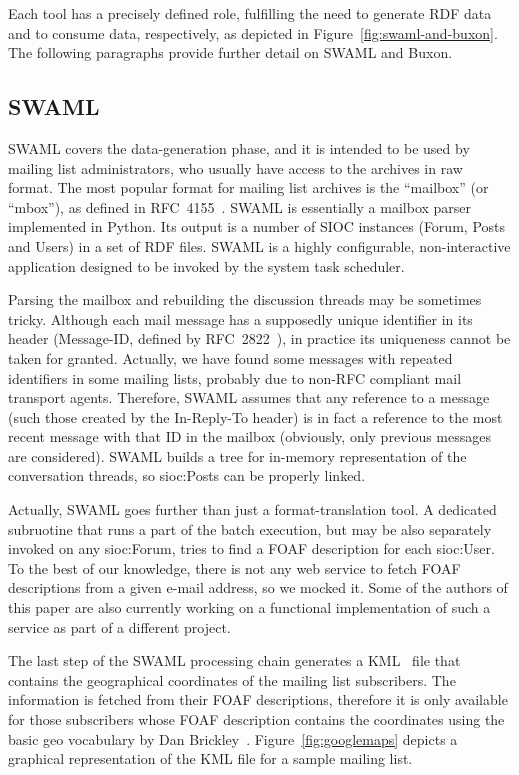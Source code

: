\documentclass{llncs}
\begin{document}
Each tool has a precisely defined role, fulfilling the need to
generate RDF data and to consume data, respectively, as depicted
in Figure~\ref{fig:swaml-and-buxon}. The following paragraphs
provide further detail on SWAML and Buxon.

\subsection{SWAML}

SWAML covers the data-generation phase, and it is intended to be
used by mailing list administrators, who usually have access to
the archives in raw format. The most popular format for
mailing list archives is the ``mailbox'' (or ``mbox''), as defined
in RFC~4155~\cite{RFC4155}. SWAML is essentially a mailbox parser
implemented in Python. Its output is a number of SIOC instances
(\textsf{Forum}, \textsf{Post}s and \textsf{User}s) in a set
of RDF files. SWAML is a highly configurable, non-interactive
application designed to be invoked by the system task scheduler.

Parsing the mailbox and rebuilding the discussion threads may be
sometimes tricky. Although each mail message has a supposedly unique
identifier in its header (\textsf{Message-ID}, defined by
RFC~2822~\cite{RFC2822}), in practice its uniqueness cannot be
taken for granted. Actually, we have found some
messages with repeated identifiers in some mailing lists,
probably due to non-RFC compliant mail transport agents.
Therefore, SWAML assumes that any reference to a message
(such those created by the \textsf{In-Reply-To} header)
is in fact a reference to the most recent message with that ID
in the mailbox (obviously, only previous messages are
considered). SWAML builds a tree for in-memory representation
of the conversation threads, so \textsf{sioc:Post}s can be
properly linked.

Actually, SWAML goes further than just a format-translation
tool. A dedicated subruotine that runs a part of the batch
execution, but may be also separately invoked on any
\textsf{sioc:Forum}, tries to find a FOAF description for
each \textsf{sioc:User}. To the best of our knowledge, there is not
any web service to fetch FOAF descriptions from a given e-mail
address, so we mocked it. Some of the authors of this paper are also
currently working
on a functional implementation of such a service as part of a
different project.

The last step of the SWAML processing chain generates a
KML~\cite{Ricket2006} file that contains the geographical coordinates of
the mailing list subscribers. The information is fetched from their
FOAF descriptions, therefore it is only available for those
subscribers whose FOAF description contains the coordinates
using the basic \textsf{geo} vocabulary by Dan
Brickley~\cite{Brickley2006}.
Figure~\ref{fig:googlemaps} depicts a graphical representation
of the KML file for a sample mailing list.
\end{document}
